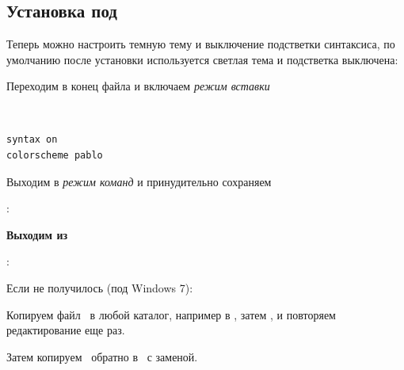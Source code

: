 \chapter{\vim}\label{vim}

\section{Установка под \win}







\bigskip

Теперь можно настроить темную тему и выключение подстветки синтаксиса, по
умолчанию после установки используется светлая тема и подстветка выключена:

\nopagebreak
{}
\bigskip

Переходим в конец файла и включаем \emph{режим вставки}

\ \ 

\begin{lstlisting}
syntax on
colorscheme pablo
\end{lstlisting}
\bigskip

Выходим в \emph{режим команд} и принудительно сохраняем

:\keys{!}
\bigskip

\textbf{Выходим из \vim}

:\keys{!}

\bigskip
Если не получилось (под Windows 7):

\bigskip
{}
\bigskip

Копируем файл \ в любой каталог, например в ,
затем , и повторяем редактирование еще раз.

\bigskip
Затем копируем \ обратно в \ с
заменой.

